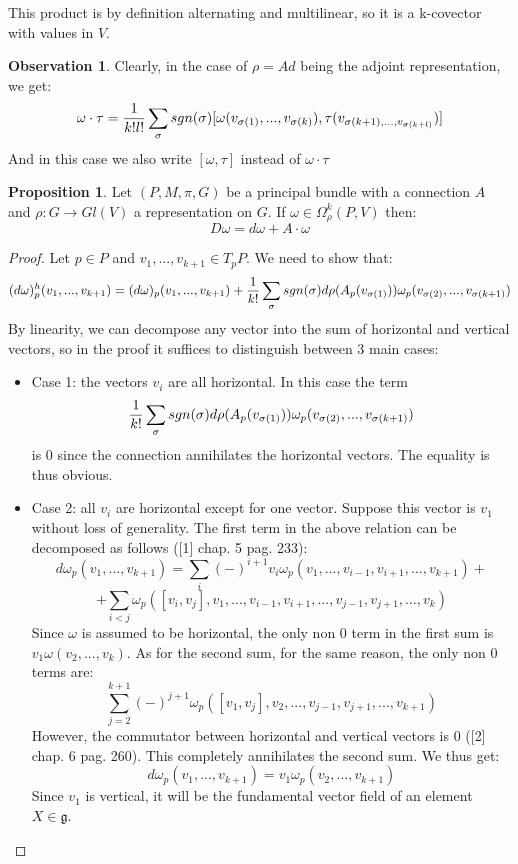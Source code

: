 \documentclass[12pt,a4paper]{report}
\theoremstyle{definition}
\theoremstyle{Theorem}
\newtheorem{Prop}[Def]{Proposition}
\theoremstyle{definition}
\theoremstyle{definition}
\newtheorem{Obs}[Def]{Observation}
\begin{document}
	This product is by definition alternating and multilinear, so it is a k-covector with values in $V$.
	\begin{Obs}
		Clearly, in the case of $\rho=Ad$ being the adjoint representation, we get:
		$$\omega\cdot \tau={1\over k!l!}\sum_\sigma sgn(\sigma)[\omega(v_{\sigma(1)},...,v_{\sigma(k)}),\tau(v_{\sigma(k+1),...,v_{\sigma(k+l)}})]$$
		And in this case we also write $[\omega,\tau]$ instead of $\omega\cdot \tau$
	\end{Obs}
	\begin{Prop}\label{Prop_6.3.4}
		Let $(P,M,\pi,G)$ be a principal bundle with a connection $A$ and $\rho:G\rightarrow Gl(V)$ a representation on $G$. If $\omega\in\Omega^k_\rho(P,V)$ then:
		$$D\omega=d\omega+A\cdot \omega$$
	\end{Prop}
	\begin{proof}
		Let $p\in P$ and $v_1,...,v_{k+1}\in T_pP$. We need to show that:
		$$(d\omega)^h_p(v_1,...,v_{k+1})=(d\omega)_p(v_1,...,v_{k+1})+{1\over k!}\sum_\sigma sgn(\sigma)d\rho(A_p(v_{\sigma(1)}))\omega_p(v_{\sigma(2)},...,v_{\sigma(k+1)})$$
		By linearity, we can decompose any vector into the sum of horizontal and vertical vectors, so in the proof it suffices to distinguish between 3 main cases:
		\begin{itemize}
			\item Case 1: the vectors $v_i$ are all horizontal. In this case the term 
			$${1\over k!}\sum_\sigma sgn(\sigma)d\rho(A_p(v_{\sigma(1)}))\omega_p(v_{\sigma(2)},...,v_{\sigma(k+1)})$$
			is 0 since the connection annihilates the horizontal vectors. The equality is thus obvious.
			\item Case 2: all $v_i$ are horizontal except for one vector. Suppose this vector is $v_1$ without loss of generality. The first term in the above relation can be decomposed as follows ([1] chap. 5 pag. 233): 
			$$d\omega_p(v_1,...,v_{k+1})=\sum_i (-)^{i+1}v_i\omega_p(v_1,...,v_{i-1},v_{i+1},...,v_{k+1})+$$
			$$+\sum_{i<j}\omega_p([v_i,v_j],v_1,...,v_{i-1},v_{i+1},...,v_{j-1},v_{j+1},...,v_k)$$
			Since $\omega$ is assumed to be horizontal, the only non 0 term in the first sum is $v_1\omega(v_2,...,v_k)$. As for the second sum, for the same reason, the only non 0 terms are:
			$$\sum_{j=2}^{k+1}(-)^{j+1}\omega_p([v_1,v_j],v_2,...,v_{j-1},v_{j+1},...,v_{k+1})$$
			However, the commutator between horizontal and vertical vectors is 0 ([2] chap. 6 pag. 260). This completely annihilates the second sum. We thus get:
			$$d\omega_p(v_1,...,v_{k+1})=v_1\omega_p(v_2,...,v_{k+1})$$
			Since $v_1$ is vertical, it will be the fundamental vector field of an element $X\in\mathfrak{g}$.

\end{itemize}
\end{proof}
\end{document}

